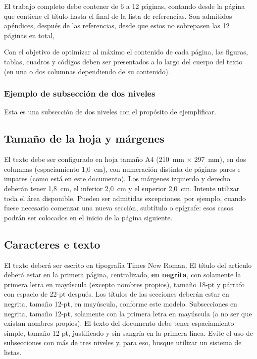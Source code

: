 \documentclass[12pt, a4paper, twoside, twocolumn]{article}
\begin{document}
El trabajo completo debe contener de 6 a 12 páginas, contando desde la página que contiene el título hasta el final de la lista de referencias. Son admitidos apéndices, después de las referencias, desde que estos no sobrepasen las 12 páginas en total,

Con el objetivo de optimizar al máximo el contenido de cada página, las figuras, tablas, cuadros y códigos deben ser presentados a lo largo del cuerpo del texto (en una o dos columnas dependiendo de su contenido).

\subsubsection{Ejemplo de subsección de dos niveles}

Esta es una subsección de dos niveles con el propósito de ejemplificar.

\subsection{Tamaño de la hoja y márgenes}

El texto debe ser configurado en hoja tamaño A4 (210~mm $\times$ 297~mm), en dos columnas (espaciamiento 1,0~cm), con numeración distinta de páginas pares e impares (como está en este documento). Los márgenes izquierdo y derecho deberán tener 1,8~cm, el inferior 2,0~cm  y el superior 2,0~cm. Intente utilizar toda el área disponible. Pueden ser admitidas excepciones, por ejemplo, cuando fuese necesario comenzar una nueva sección, subtítulo o epígrafe: esos casos podrán ser colocados en el inicio de la página siguiente.

\subsection{Caracteres e texto}

El texto deberá ser escrito en tipografía Times New Roman. El título del artículo deberá estar en la primera página, centralizado, \textbf{en negrita}, con solamente la primera letra en mayúscula (excepto nombres propios), tamaño 18-pt y párrafo con espacio de 22-pt después. Los títulos de las secciones deberán estar en negrita, tamaño 12-pt, en mayúscula, conforme este modelo. Subsecciones en negrita, tamaño 12-pt, solamente con la primera letra en mayúscula (a no ser que existan nombres propios). El texto del documento debe tener espaciamiento simple, tamaño 12-pt, justificado y sin sangría en la primera línea. Evite el uso de subsecciones con más de tres niveles y, para eso, busque utilizar un sistema de listas.
\end{document}
